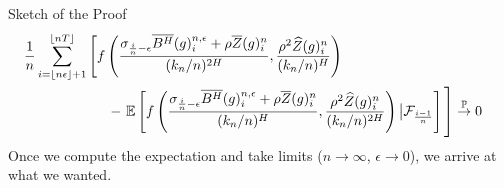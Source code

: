 \documentclass[final,hyperref={pdfpagelabels=false}]{beamer}
\newcommand{\E}{\mathbb{E}}
\begin{document}
\begin{frame}{}
\begin{columns}[t]
\begin{column}{0.4\linewidth}
\begin{block}{Sketch of the Proof}
\begin{align*}
            \phantom{}
    &\begin{aligned}
      &\frac{1}{n}\sum_{i = \left\lfloor n\epsilon \right\rfloor + 1}^{\left\lfloor nT \right\rfloor} \left[ \vphantom{\E \left[ f\left( \frac{\sigma_{\frac{i}{n}-\epsilon}\overline{B^H}(g)^{n,\epsilon}_i + \rho\overline{Z}(g)^n_i}{(k_n/n)^{2H}}, \frac{\rho^2\widehat{Z}(g)^n_i}{(k_n/n)^H}\right) \right] } f\left( \frac{\sigma_{\frac{i}{n}-\epsilon}\overline{B^H}(g)^{n,\epsilon}_i + \rho\overline{Z}(g)^n_i}{(k_n/n)^{2H}}, \frac{\rho^2\widehat{Z}(g)^n_i}{(k_n/n)^H}\right) \right. \\ &\hspace*{2.1cm} - \left. \E\left[ f\left( \frac{\sigma_{\frac{i}{n}-\epsilon}\overline{B^H}(g)^{n,\epsilon}_i + \rho\overline{Z}(g)^n_i}{(k_n/n)^{H}}, \frac{\rho^2\widehat{Z}(g)^n_i}{(k_n/n)^{2H}}\right) \big| \mathcal{F}_{\frac{i-1}{n}} \right] \vphantom{\frac{1}{n}\sum_{i = \left\lfloor n\epsilon \right\rfloor + 1}^{\left\lfloor nT \right\rfloor}} \right] \overset{\mathbb{P}}{\rightarrow} 0
    \end{aligned}
          \end{align*}
          Once we compute the expectation and take limits (\(n \rightarrow \infty\), \(\epsilon \rightarrow 0\)), we arrive at what we wanted.
        \end{block}
      \end{column}


\end{columns}
\end{frame}
\end{document}
